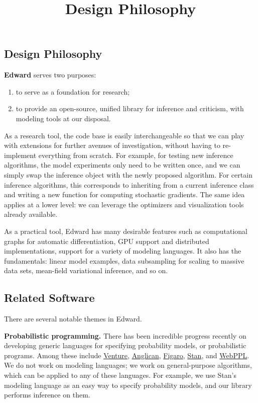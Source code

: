 \title{Design Philosophy}

\subsection{Design Philosophy}

\textbf{Edward} serves two purposes:

\begin{enumerate}
\def\labelenumi{\arabic{enumi}.}
\item
  to serve as a foundation for research;
\item
  to provide an open-source, unified library for inference and
  criticism, with modeling tools at our disposal.
\end{enumerate}

As a research tool, the code base is easily interchangeable so that we
can play with extensions for further avenues of investigation, without
having to re-implement everything from scratch. For example, for testing
new inference algorithms, the model experiments only need to be written
once, and we can simply swap the inference object with the newly
proposed algorithm. For certain inference algorithms, this corresponds
to inheriting from a current inference class and writing a new function
for computing stochastic gradients. The same idea applies at a lower
level: we can leverage the optimizers and visualization tools already
available.

As a practical tool, Edward has many desirable features such as
computational graphs for automatic differentiation, GPU support and
distributed implementations, support for a variety of modeling
languages. It also has the fundamentals: linear model examples, data
subsampling for scaling to massive data sets, mean-field variational
inference, and so on.

\subsection{Related Software}\label{related-software}

There are several notable themes in Edward.

\textbf{Probabilistic programming.} There has been incredible progress
recently on developing generic languages for specifying probability
models, or probabilistic programs. Among these include
\href{http://probcomp.csail.mit.edu/venture/}{Venture},
\href{http://www.robots.ox.ac.uk/~fwood/anglican/literature/index.html}{Anglican},
\href{https://www.cra.com/work/case-studies/figaro}{Figaro},
\href{http://mc-stan.org}{Stan}, and
\href{http://dippl.org/chapters/02-webppl.html}{WebPPL}. We do not work
on modeling languages; we work on general-purpose algorithms, which can
be applied to any of these languages. For example, we use Stan's
modeling language as an easy way to specify probability models, and our
library performs inference on them.

